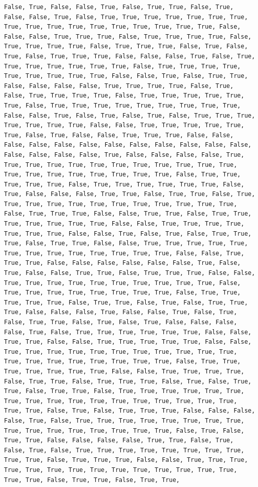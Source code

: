 \documentclass[
  letterpaper,
  DIV=11,
  numbers=noendperiod]{scrartcl}
\begin{document}
\begin{verbatim}
False, True, False, False, True, False, True, True, False, True, False, False, True, False, True, True, True, True, True, True, True, True, True, True, True, True, True, True, True, True, True, False, False, False, True, True, True, False, True, True, True, True, False, True, True, True, True, False, True, True, True, False, True, False, True, False, True, True, True, False, False, False, True, False, True, True, True, True, True, True, True, False, True, True, True, True, True, True, True, True, True, False, False, True, False, True, True, False, False, False, False, True, True, True, True, False, True, False, True, True, True, True, False, True, True, True, True, True, True, False, True, True, True, True, True, True, True, True, True, False, False, True, False, True, False, True, False, True, True, True, True, True, True, True, False, False, True, True, True, True, True, True, False, True, False, False, True, True, True, False, False, False, False, False, False, False, False, False, False, False, False, False, False, False, False, True, False, False, False, False, True, True, True, True, True, True, True, True, True, True, True, True, True, True, True, True, True, True, True, True, False, True, True, True, True, True, False, True, True, True, True, True, True, False, True, False, False, False, True, True, False, True, True, False, True, True, True, True, True, True, True, True, True, True, True, True, False, True, True, True, False, False, True, True, False, True, True, True, True, True, True, True, False, False, True, True, True, True, True, True, True, False, False, True, False, True, False, True, True, True, False, True, True, False, False, True, True, True, True, True, True, True, True, True, True, True, True, True, False, False, True, True, True, False, False, False, False, False, False, True, False, True, False, False, True, True, False, True, True, True, False, False, True, True, True, True, True, True, True, True, True, True, False, True, True, True, True, True, True, True, True, False, True, True, True, True, True, False, True, True, False, True, False, True, True, True, False, False, False, True, False, False, True, False, True, False, True, True, False, True, False, True, False, False, False, False, True, False, True, True, True, True, True, True, False, False, True, True, False, False, True, True, True, True, True, False, False, True, True, True, True, True, True, True, True, True, True, True, True, True, True, True, True, True, True, True, False, True, True, True, True, True, True, True, False, False, True, True, True, True, False, True, True, False, True, True, True, False, True, False, True, True, False, True, True, False, True, True, True, True, True, True, True, True, True, True, True, True, True, True, True, True, True, True, True, False, True, False, True, True, True, False, False, False, False, True, False, True, True, True, True, True, True, True, True, True, True, True, True, True, True, True, True, False, True, False, True, True, False, False, False, False, True, True, False, True, False, True, False, True, True, True, True, True, True, True, True, True, True, False, True, True, True, False, False, True, True, True, True, True, True, True, True, True, True, True, True, True, True, True, True, False, True, True, False, True, True, 
\end{verbatim}
\end{document}
